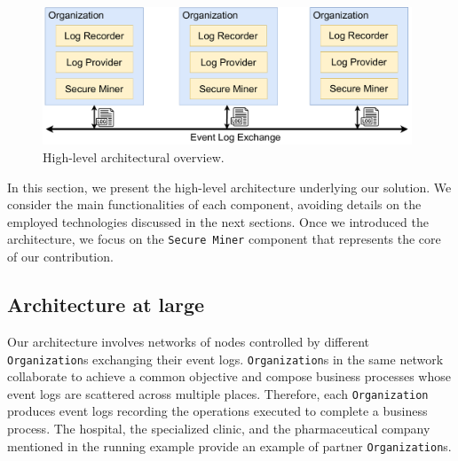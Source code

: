 \begin{figure}[t]
\centering
\includegraphics[width=11cm]{content/figures/architecture_diagram.pdf}
\caption{High-level architectural overview.}
\label{fig:architecture_diagram}
\end{figure}
In this section, we present the high-level architecture underlying our solution. We consider the main functionalities of each component, avoiding details on the employed technologies discussed in the next sections. Once we introduced the architecture, we focus on the \texttt{Secure Miner} component that represents the core of our contribution.

\subsection{Architecture at large}
Our architecture involves networks of nodes controlled by different \texttt{Organization}s exchanging their event logs. \texttt{Organization}s in the same network collaborate to achieve a common objective and compose business processes whose event logs are scattered across multiple places. Therefore, each \texttt{Organization} produces event logs recording the operations executed to complete a business process. The hospital, the specialized clinic, and the pharmaceutical company mentioned in the running example provide an example of partner \texttt{Organization}s.

